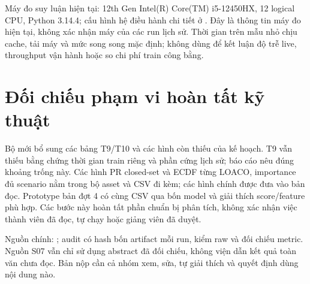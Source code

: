 Máy đo suy luận hiện tại: 12th Gen Intel(R) Core(TM) i5-12450HX, 12 logical CPU, Python 3.14.4; cấu hình hệ điều hành chi tiết ở . Đây là thông tin máy đo hiện tại, không xác nhận máy của các run lịch sử. Thời gian trên mẫu nhỏ chịu cache, tải máy và mức song song mặc định; không dùng để kết luận độ trễ live, throughput vận hành hoặc so chi phí train công bằng.

\section{Đối chiếu phạm vi hoàn tất kỹ thuật}
Bộ mới bổ sung các bảng T9/T10 và các hình còn thiếu của kế hoạch. T9 vẫn thiếu bằng chứng thời gian train riêng và phần cứng lịch sử; báo cáo nêu đúng khoảng trống này. Các hình PR closed-set và ECDF từng LOACO, importance đủ scenario nằm trong bộ asset và CSV đi kèm; các hình chính được đưa vào bản đọc. Prototype bản đợt 4 có cùng CSV qua bốn model và giải thích score/feature phù hợp. Các bước này hoàn tất phần chuẩn bị phân tích, không xác nhận việc thành viên đã đọc, tự chạy hoặc giảng viên đã duyệt.

Nguồn chính: ; audit có hash bốn artifact mỗi run, kiểm raw và đối chiếu metric. Nguồn S07 vẫn chỉ sử dụng abstract đã đối chiếu, không viện dẫn kết quả toàn văn chưa đọc. Bản nộp cần cả nhóm xem, sửa, tự giải thích và quyết định dùng nội dung nào.
